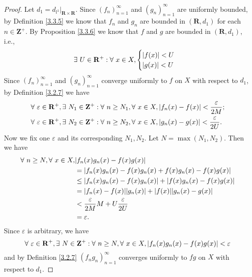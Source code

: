 \begin{proof}
    Let \(d_1 = d_{l^1}|_{\mathbf{R} \times \mathbf{R}}\).
    Since \((f_n)_{n = 1}^\infty\) and \((g_n)_{n = 1}^\infty\) are uniformly bounded, by Definition \ref{3.3.5} we know that \(f_n\) and \(g_n\) are bounded in \((\mathbf{R}, d_1)\) for each \(n \in \mathbf{Z}^+\).
    By Proposition \ref{3.3.6} we know that \(f\) and \(g\) are bounded in \((\mathbf{R}, d_1)\), i.e.,
    \[
        \exists\ U \in \mathbf{R}^+ : \forall\ x \in X, \begin{cases}
            \abs*{f(x)} < U \\
            \abs*{g(x)} < U
        \end{cases}
    \]
    Since \((f_n)_{n = 1}^\infty\) and \((g_n)_{n = 1}^\infty\) converge uniformly to \(f\) on \(X\) with respect to \(d_1\), by Definition \ref{3.2.7} we have
    \begin{align*}
         & \forall\ \varepsilon \in \mathbf{R}^+, \exists\ N_1 \in \mathbf{Z}^+ : \forall\ n \geq N_1, \forall\ x \in X, \abs*{f_n(x) - f(x)} < \frac{\varepsilon}{2M}; \\
         & \forall\ \varepsilon \in \mathbf{R}^+, \exists\ N_2 \in \mathbf{Z}^+ : \forall\ n \geq N_2, \forall\ x \in X, \abs*{g_n(x) - g(x)} < \frac{\varepsilon}{2U}.
    \end{align*}
    Now we fix one \(\varepsilon\) and its corresponding \(N_1, N_2\).
    Let \(N = \max(N_1, N_2)\).
    Then we have
    \begin{align*}
        \forall\ n \geq N, \forall\ x \in X, & \abs*{f_n(x) g_n(x) - f(x) g(x)}                                         \\
                                             & = \abs*{f_n(x) g_n(x) - f(x) g_n(x) + f(x) g_n(x) - f(x) g(x)}           \\
                                             & \leq \abs*{f_n(x) g_n(x) - f(x) g_n(x)} + \abs*{f(x) g_n(x) - f(x) g(x)} \\
                                             & = \abs*{f_n(x) - f(x)} \abs*{g_n(x)} + \abs*{f(x)} \abs*{g_n(x) - g(x)}  \\
                                             & < \frac{\varepsilon}{2M} M + U \frac{\varepsilon}{2U}                    \\
                                             & = \varepsilon.
    \end{align*}
    Since \(\varepsilon\) is arbitrary, we have
    \[
        \forall\ \varepsilon \in \mathbf{R}^+, \exists\ N \in \mathbf{Z}^+ : \forall\ n \geq N, \forall\ x \in X, \abs*{f_n(x) g_n(x) - f(x) g(x)} < \varepsilon
    \]
    and by Definition \ref{3.2.7} \((f_n g_n)_{n = 1}^\infty\) converges uniformly to \(fg\) on \(X\) with respect to \(d_1\).
\end{proof}